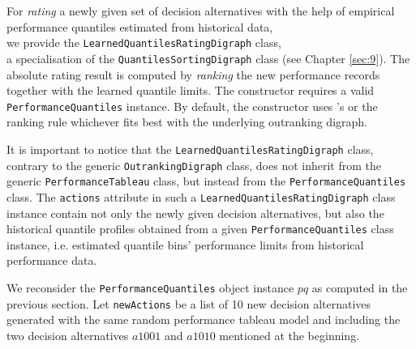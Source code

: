 For \emph{rating} a newly given set of decision alternatives with the help of empirical performance quantiles estimated from historical data,\\we provide the \texttt{LearnedQuantilesRatingDigraph} class,\\ a specialisation of the \texttt{QuantilesSortingDigraph} class (see Chapter \ref{sec:9}). The absolute rating result is computed by \emph{ranking} the new performance records together with the learned quantile limits. The constructor requires a valid \texttt{PerformanceQuantiles} instance. By default, the constructor uses \Copeland 's or the \NetFlows ranking rule whichever fits best with the underlying outranking digraph.

\begin{svgraybox}It is important to notice that the \texttt{LearnedQuantilesRatingDigraph} class, contrary to the generic \texttt{OutrankingDigraph} class, does not inherit from the generic \texttt{PerformanceTableau} class, but instead from the \texttt{PerformanceQuantiles} class. The \texttt{actions} attribute in such a \texttt{LearnedQuantilesRatingDigraph} class instance contain not only the newly given decision alternatives, but also the historical quantile profiles obtained from a given \texttt{PerformanceQuantiles} class instance, i.e. estimated quantile bins' performance limits from historical performance data.
\end{svgraybox}

We reconsider the \texttt{PerformanceQuantiles} object instance $pq$ as computed in the previous section. Let \texttt{newActions} be a list of 10 new decision alternatives generated with the same random performance tableau model and including the two decision alternatives $a1001$ and $a1010$ mentioned at the beginning.

